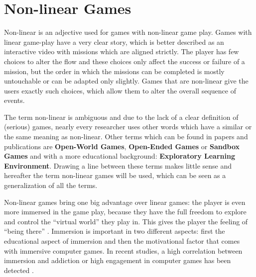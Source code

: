 




\section{Non-linear Games}

Non-linear is an adjective used for games with non-linear game play. Games
with linear game-play have a very clear story, which is better described as an interactive
video with missions which are aligned strictly. The player has few choices
to alter the flow and these choices only affect the success or failure of a
mission, but the order in which the missions can be completed is mostly
untouchable or can be adapted only slightly. Games that are non-linear give the
users exactly such choices, which allow them to alter the overall sequence of
events.

The term non-linear is ambiguous and due to the lack of a clear definition of
(serious) games, nearly every researcher uses other words which have a similar
or the same meaning as non-linear. Other terms which can be found in papers
and publications are \textbf{Open-World Games}, \textbf{Open-Ended
Games} or \textbf{Sandbox Games} and with a more educational background:
\textbf{Exploratory Learning Environment}. Drawing a line between these terms
makes little sense and hereafter the term non-linear games will be used,
which can be seen as a generalization of all the terms.

Non-linear games bring one big advantage over linear games: the player is even
more immersed in the game play, because they have the full freedom to explore
and control the ``virtual world'' they play in. This gives the player the feeling of ``being
there'' \cite{Psotka1995a}. Immersion is important in two different
aspects: first the educational aspect of immersion and then the motivational
factor that comes with immersive computer games. In recent studies, a high
correlation between immersion and addiction or high engagement in
computer games has been detected \cite{Seah2008a}.

